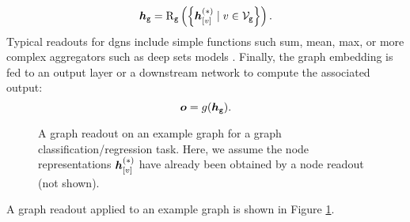 $$\GraphRepr{g} = \GraphReadout{g}\Par{\Set{\StateVector{v}{*} \mid v \in \Nodes{g}}}.$$
Typical readouts for \glspl{dgn} include simple functions such sum, mean, max, or more complex aggregators such as deep sets models \citep{zaheer2017deepsets}. Finally, the graph embedding is fed to an output layer or a downstream network to compute the associated output:
$$\Vector{o} = g(\GraphRepr{g}).$$
\begin{figure*}[h!]
    \centering
    \resizebox{.6\textwidth}{!}{}
    \caption{A graph readout on an example graph for a graph classification/regression task. Here, we assume the node representations $\StateVector{v}{*}$ have already been obtained by a node readout (not shown).}
    \label{fig:graph-readout}
\end{figure*}
A graph readout applied to an example graph is shown in Figure \ref{fig:graph-readout}.

